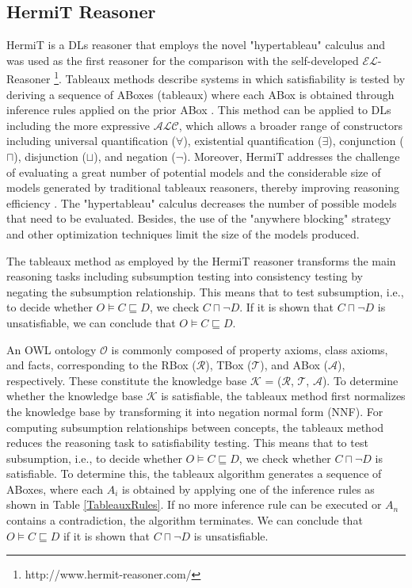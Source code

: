 \documentclass[a4paper]{article}
\theoremstyle{plain}
\theoremstyle{definition}
\begin{document}
    \subsection{HermiT Reasoner}
    HermiT is a DLs reasoner that employs the novel "hypertableau" calculus and was used as the first reasoner for the comparison with the self-developed $\mathcal{EL}$-Reasoner \footnote[1]{http://www.hermit-reasoner.com/}. Tableaux methods describe systems in which satisfiability is tested by deriving a sequence of ABoxes (tableaux) where each ABox is obtained through inference rules applied on the prior ABox \cite{Horrocks2012TheHO}. This method can be applied to DLs including the more expressive $\mathcal{ALC}$, which allows a broader range of constructors including universal quantification ($\forall$), existential quantification ($\exists$), conjunction ($\sqcap$), disjunction ($\sqcup$), and negation ($\neg$). Moreover, HermiT addresses the challenge of evaluating a great number of potential models and the considerable size of models generated by traditional tableaux reasoners, thereby improving reasoning efficiency \cite{Hermit}. The "hypertableau" calculus decreases the number of possible models that need to be evaluated. Besides, the use of the "anywhere blocking" strategy and other optimization techniques limit the size of the models produced.

    The tableaux method as employed by the HermiT reasoner transforms the main reasoning tasks including subsumption testing into consistency testing by negating the subsumption relationship. This means that to test subsumption, i.e., to decide whether $O \models C \sqsubseteq D$, we check $C \sqcap \neg D$. If it is shown that $C \sqcap \neg D$ is unsatisfiable, we can conclude that $O \models C \sqsubseteq D$.
    
    An OWL ontology $\mathcal{O}$ is commonly composed of property axioms, class axioms, and facts, corresponding to the RBox ($\mathcal{R}$), TBox ($\mathcal{T}$), and ABox ($\mathcal{A}$), respectively. These constitute the knowledge base $\mathcal{K}$ = ($\mathcal{R}$, $\mathcal{T}$, $\mathcal{A}$). To determine whether the knowledge base $\mathcal{K}$ is satisfiable, the tableaux method first normalizes the knowledge base by transforming it into negation normal form (NNF). For computing subsumption relationships between concepts, the tableaux method reduces the reasoning task to satisfiability testing. This means that to test subsumption, i.e., to decide whether $O \models C \sqsubseteq D$, we check whether $C \sqcap \neg D$ is satisfiable. To determine this, the tableaux algorithm generates a sequence of ABoxes, where each $A_i$ is obtained by applying one of the inference rules as shown in Table \ref{TableauxRules}. If no more inference rule can be executed or $A_n$ contains a contradiction, the algorithm terminates. We can conclude that $O \models C \sqsubseteq D$ if it is shown that $C \sqcap \neg D$ is unsatisfiable.
\end{document}
